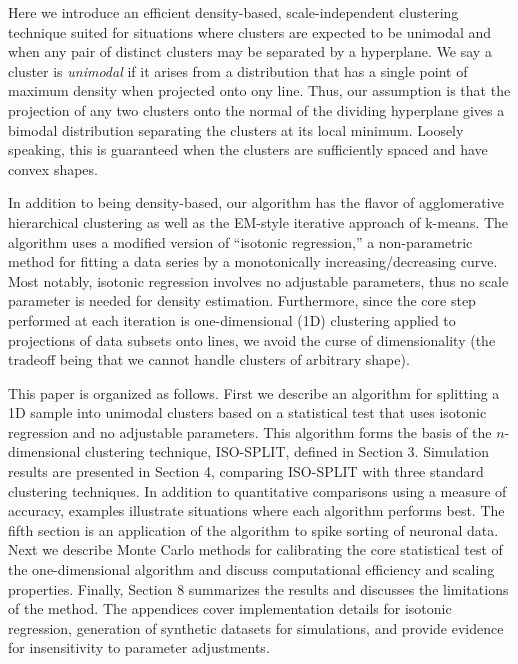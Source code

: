 \documentclass[10pt]{article}
\begin{document}
Here we introduce an efficient density-based, scale-independent clustering technique suited for situations where clusters are expected to be unimodal and when any pair of distinct clusters may be separated by a hyperplane. We say a cluster is {\em unimodal} if it arises from a distribution that has a single point of maximum density when projected onto ony line. Thus, our assumption is that the projection of any two clusters onto the normal of the dividing hyperplane gives a bimodal distribution separating the clusters at its local minimum. Loosely speaking, this is guaranteed when the clusters are sufficiently spaced and have convex shapes.

In addition to being density-based, our algorithm has the flavor of agglomerative hierarchical clustering as well as the EM-style iterative approach of k-means. The algorithm uses a modified version of ``isotonic regression,'' \cite{pava}
a non-parametric method for fitting a data series by a monotonically increasing/decreasing curve. Most notably, isotonic regression involves no adjustable parameters, thus no scale parameter is needed for density estimation. Furthermore, since the core step performed at each iteration is one-dimensional (1D) clustering applied to projections of data subsets onto lines, we avoid the curse of dimensionality (the tradeoff being that we cannot handle clusters of arbitrary shape).

This paper is organized as follows. First we describe an algorithm for splitting a 1D sample into unimodal clusters based on a statistical test that uses isotonic regression and no adjustable parameters. This algorithm forms the basis of the $n$-dimensional clustering technique, ISO-SPLIT, defined in Section 3. Simulation results are presented in Section 4, comparing ISO-SPLIT with three standard clustering techniques. In addition to quantitative comparisons using a measure of accuracy, examples illustrate situations where each algorithm performs best. The fifth section is an application of the algorithm to spike sorting of neuronal data. Next we describe Monte Carlo methods for calibrating the core statistical test of the one-dimensional algorithm and discuss computational efficiency and scaling properties. Finally, Section 8 summarizes the results and discusses the limitations of the method. The appendices cover implementation details for isotonic regression, generation of synthetic datasets for simulations, and provide evidence for insensitivity to parameter adjustments.
\end{document}
